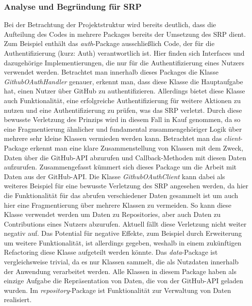 \documentclass[12pt]{article}
\begin{document}
\subsubsection{Analyse und Begründung für SRP}
\label{sec:Analyse_SRP}
Bei der Betrachtung der Projektstruktur wird bereits deutlich, dass die Aufteilung des Codes in mehrere Packages bereits der Umsetzung des SRP dient.
Zum Beispiel enthält das \textit{auth}-Package ausschließlich Code, der für die Authentifizierung (kurz: Auth) verantwortlich ist.
Hier finden sich Interfaces und dazugehörige Implementierungen, die nur für die Authentifizierung eines Nutzers verwendet werden.
Betrachtet man innerhalb dieses Packages die Klasse \textit{GithubOAuthHandler} genauer, erkennt man, dass diese Klasse die Hauptaufgabe hat, einen Nutzer über GitHub zu authentifizieren.
Allerdings bietet diese Klasse auch Funktionalität, eine erfolgreiche Authentifizierung für weitere Aktionen zu nutzen und eine Authentifizierung zu prüfen, was das SRP verletzt.
Durch diese bewusste Verletzung des Prinzips wird in diesem Fall  in Kauf genommen, da so eine Fragmentierung ähnlicher und fundamental zusammengehöriger Logik über mehrere sehr kleine Klassen vermieden werden kann.
\newline
Betrachtet man das \textit{client}-Package erkennt man eine klare Zusammenstellung von Klassen mit dem Zweck, Daten über die GitHub-API abzurufen und Callback-Methoden mit diesen Daten aufzurufen.
Zusammengefasst kümmert sich dieses Package um die Arbeit mit Daten aus der GitHub-API.
Die Klasse \textit{GithubOAuthClient} kann dabei als weiteres Beispiel für eine bewusste Verletzung des SRP angesehen werden, da hier die Funktionalität für das abrufen verschiedener Daten gesammelt ist um auch hier eine Fragmentierung über mehrere Klassen zu vermeiden. 
So kann diese Klasse verwendet werden um Daten zu Repositories, aber auch Daten zu Contributions eines Nutzers abzurufen.
Aktuell fällt diese Verletzung nicht weiter negativ auf.
Das Potential für negative Effekte, zum Beispiel durch Erweiterung um weitere Funktionalität, ist allerdings gegeben, weshalb in einem zukünftigen Refactoring diese Klasse aufgeteilt werden könnte.
\newline
Das \textit{data}-Package ist vergleichsweise trivial, da es nur Klassen sammelt, die als Nutzdaten innerhalb der Anwendung verarbeitet werden.
Alle Klassen in diesem Package haben als einzige Aufgabe die Repräsentation von Daten, die von der GitHub-API geladen wurden.
\newline
Im \textit{repository}-Package ist Funktionalität zur Verwaltung von Daten realisiert.
\end{document}
